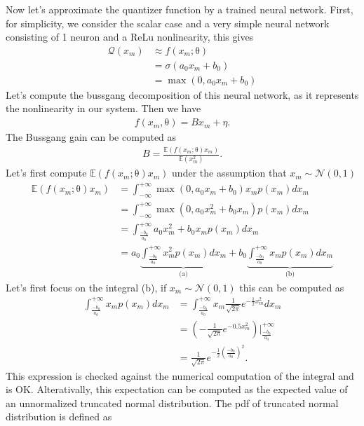 \documentclass[12pt]{article}
\newcommand{\vect}[1]{\boldsymbol{\mathrm{#1}}}
\newcommand{\expt}[1]{\mathbb{E}\left(#1\right)}
\theoremstyle{remark}
\begin{document}
Now let's approximate the quantizer function by a trained neural network. First, for simplicity, we consider the scalar case and a very simple neural network consisting of 1 neuron and a ReLu nonlinearity, this gives
\begin{align}
	\mathcal{Q}(x_m) &\approx f(x_m; \vect{\theta})\\
	&= \sigma(a_0x_m + b_0)\\
	&= \max(0, a_0x_m + b_0)
\end{align}
Let's compute the bussgang decomposition of this neural network, as it represents the nonlinearity in our system. Then we have
\begin{align}
	f(x_m, \vect{\theta}) = B x_m + \eta.
\end{align}
The Bussgang gain can be computed as 
\begin{align}
	B = \frac{\expt{f(x_m; \vect{\theta})x_m}}{\expt{x_m^2}}.
\end{align}
Let's first compute $\expt{f(x_m; \vect{\theta})x_m}$ under the assumption that $x_m\sim \mathcal{N}(0, 1)$ 
\begin{align}
	\expt{f(x_m; \vect{\theta})x_m} &= \int_{-\infty}^{+\infty} \max(0, a_0x_m + b_0) x_m p(x_m) dx_m\\
	&= \int_{-\infty}^{+\infty} \max(0, a_0x_m^2 + b_0x_m) p(x_m) dx_m\\
	&= \int_{\frac{-b_0}{a_0}}^{+\infty} a_0x_m^2 + b_0x_m p(x_m) dx_m\\
	&= a_0\underbrace{\int_{\frac{-b_0}{a_0}}^{+\infty} x_m^2 p(x_m) dx_m}_{\text{(a)}} + b_0 \underbrace{\int_{\frac{-b_0}{a_0}}^{+\infty} x_m p(x_m) dx_m}_{\text{(b)}}
\end{align}
Let's first focus on the integral (b), if $x_m\sim \mathcal{N}(0, 1)$ this can be computed as
\begin{align}
	\int_{\frac{-b_0}{a_0}}^{+\infty} x_m p(x_m) dx_m &= \int_{\frac{-b_0}{a_0}}^{+\infty} x_m \frac{1}{\sqrt{2\pi}} e^{-\frac{1}{2}x_m^2}dx_m\\
	&= \left(-\frac{1}{\sqrt{2\pi}} e^{-0.5 x_m^2}\right)\Bigg|_{\frac{-b_0}{a_0}}^{+\infty}\\
	&= \frac{1}{\sqrt{2\pi}} e^{-\frac{1}{2} \left(\frac{-b_0}{a_0}\right)^2}. \label{eq:int_result_1}
\end{align}
This expression is checked against the numerical computation of the integral and is OK.
Alterativally, this expectation can be computed as the expected value of an unnormalized truncated normal distribution. The pdf of truncated normal distribution is defined as
\end{document}

